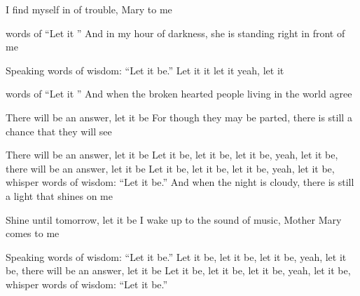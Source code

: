 

\zs
{} I find myself in  of trouble,
 Mary  to me

 words of  ``Let it '' 
\ks
\zs
And in my hour of darkness,
she is standing right in front of me

Speaking words of wisdom: ``Let it be.''
\ks
\zr
Let it  it  let it  yeah, let it 

 words of  ``Let it '' 
\kr
\zs
And when the broken hearted people
living in the world agree

There will be an answer, let it be
\ks
\zs
For though they may be parted,
there is still a chance that they will see

There will be an answer, let it be
\ks
\zr
Let it be, let it be, let it be, yeah, let it be,
there will be an answer, let it be
\kr
\zr
Let it be, let it be, let it be, yeah, let it be,
whisper words of wisdom: ``Let it be.''
\kr
\zs
And when the night is cloudy,
there is still a light that shines on me

Shine until tomorrow, let it be
\ks
\zs
I wake up to the sound of music,
Mother Mary comes to me

Speaking words of wisdom: ``Let it be.''
\ks
\zr
Let it be, let it be, let it be, yeah, let it be,
there will be an answer, let it be
\kr
\zr
Let it be, let it be, let it be, yeah, let it be,
whisper words of wisdom: ``Let it be.''
\kr

\kp





